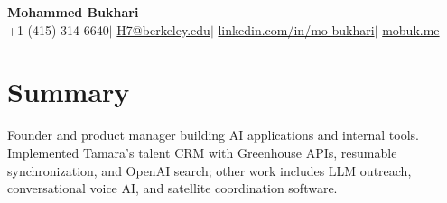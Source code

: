 \documentclass[a4paper,10pt]{article}
\begin{document}
\begin{center}
  {\LARGE\bfseries Mohammed Bukhari}\\[3pt]
  +1 (415) 314-6640\enspace$|$\enspace
  \href{mailto:H7@berkeley.edu}{H7@berkeley.edu}\enspace$|$\enspace
  \href{https://www.linkedin.com/in/mo-bukhari/}{linkedin.com/in/mo-bukhari}\enspace$|$\enspace
  \href{https://mobuk.me}{mobuk.me}
\end{center}
\vspace{-5pt}

\section{Summary}
Founder and product manager building AI applications and internal tools. Implemented Tamara's talent CRM with Greenhouse APIs, resumable synchronization, and OpenAI search; other work includes LLM outreach, conversational voice AI, and satellite coordination software.
\end{document}
